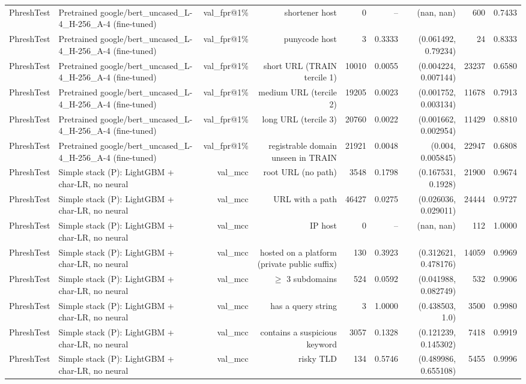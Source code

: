 \begin{table}[t]
\begin{tabular}{llrrrrrrr}
PhreshTest & Pretrained google/bert\_uncased\_L-4\_H-256\_A-4 (fine-tuned) & val\_fpr@1\% & shortener host & 0 & -- & (nan, nan) & 600 & 0.7433 \\
PhreshTest & Pretrained google/bert\_uncased\_L-4\_H-256\_A-4 (fine-tuned) & val\_fpr@1\% & punycode host & 3 & 0.3333 & (0.061492, 0.79234) & 24 & 0.8333 \\
PhreshTest & Pretrained google/bert\_uncased\_L-4\_H-256\_A-4 (fine-tuned) & val\_fpr@1\% & short URL (TRAIN tercile 1) & 10010 & 0.0055 & (0.004224, 0.007144) & 23237 & 0.6580 \\
PhreshTest & Pretrained google/bert\_uncased\_L-4\_H-256\_A-4 (fine-tuned) & val\_fpr@1\% & medium URL (tercile 2) & 19205 & 0.0023 & (0.001752, 0.003134) & 11678 & 0.7913 \\
PhreshTest & Pretrained google/bert\_uncased\_L-4\_H-256\_A-4 (fine-tuned) & val\_fpr@1\% & long URL (tercile 3) & 20760 & 0.0022 & (0.001662, 0.002954) & 11429 & 0.8810 \\
PhreshTest & Pretrained google/bert\_uncased\_L-4\_H-256\_A-4 (fine-tuned) & val\_fpr@1\% & registrable domain unseen in TRAIN & 21921 & 0.0048 & (0.004, 0.005845) & 22947 & 0.6808 \\
PhreshTest & Simple stack (P): LightGBM + char-LR, no neural & val\_mcc & root URL (no path) & 3548 & 0.1798 & (0.167531, 0.1928) & 21900 & 0.9674 \\
PhreshTest & Simple stack (P): LightGBM + char-LR, no neural & val\_mcc & URL with a path & 46427 & 0.0275 & (0.026036, 0.029011) & 24444 & 0.9727 \\
PhreshTest & Simple stack (P): LightGBM + char-LR, no neural & val\_mcc & IP host & 0 & -- & (nan, nan) & 112 & 1.0000 \\
PhreshTest & Simple stack (P): LightGBM + char-LR, no neural & val\_mcc & hosted on a platform (private public suffix) & 130 & 0.3923 & (0.312621, 0.478176) & 14059 & 0.9969 \\
PhreshTest & Simple stack (P): LightGBM + char-LR, no neural & val\_mcc & $\geq$ 3 subdomains & 524 & 0.0592 & (0.041988, 0.082749) & 532 & 0.9906 \\
PhreshTest & Simple stack (P): LightGBM + char-LR, no neural & val\_mcc & has a query string & 3 & 1.0000 & (0.438503, 1.0) & 3500 & 0.9980 \\
PhreshTest & Simple stack (P): LightGBM + char-LR, no neural & val\_mcc & contains a suspicious keyword & 3057 & 0.1328 & (0.121239, 0.145302) & 7418 & 0.9919 \\
PhreshTest & Simple stack (P): LightGBM + char-LR, no neural & val\_mcc & risky TLD & 134 & 0.5746 & (0.489986, 0.655108) & 5455 & 0.9996 \\

\end{tabular}
\end{table}
